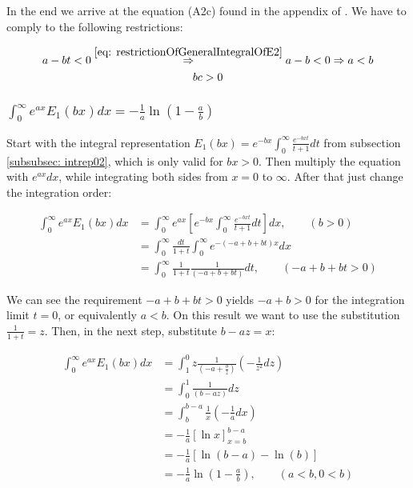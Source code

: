 \documentclass[bibliography=totocnumbered]{scrartcl}
\newcommand{\assume}[1][\text{MISSING PARAMETER}]{,\qquad\left(#1\right)}
\begin{document}
	In the end we arrive at the equation (A2c) found in the appendix of \cite{boer1990calc}. We have to comply to the following restrictions:

	\begin{subequations}
		\begin{gather}
			a-bt<0\overset{\eqref{eq: restrictionOfGeneralIntegralOfE2}}{\Rightarrow}a-b<0\Rightarrow{}a<b\\
			bc>0
		\end{gather}
	\end{subequations}

	\subsubsection[A integral of E1(x), involving the exponential function]{$\int_{0}^{\infty}e^{ax}E_1\left(bx\right)dx=-\frac{1}{a}\ln\left(1-\frac{a}{b}\right)$}
	\label{subsubsec: generalIntegralOfE3}

	Start with the integral representation $E_1\left(bx\right)=e^{-bx}\int_{0}^{\infty}\frac{e^{-bxt}}{t+1}dt$ from subsection \ref{subsubsec: intrep02}, which is only valid for $bx>0$. Then multiply the equation with $e^{ax}dx$, while integrating both sides from $x=0$ to $\infty$. After that just change the integration order:

	\begin{align}
		\int_{0}^{\infty}e^{ax}E_1\left(bx\right)dx&=\int_{0}^{\infty}e^{ax}\left[e^{-bx}\int_{0}^{\infty}\frac{e^{-bxt}}{t+1}dt\right]dx\assume[b>0]\\
		&=\int_{0}^{\infty}\frac{dt}{1+t}\int_{0}^{\infty}e^{-\left(-a+b+bt\right)x}dx\\
		&=\int_{0}^{\infty}\frac{1}{1+t}\frac{1}{\left(-a+b+bt\right)}dt\assume[-a+b+bt>0]
	\end{align}

	We can see the requirement $-a+b+bt>0$ yields $-a+b>0$ for the integration limit $t=0$, or equivalently $a<b$. On this result we want to use the substitution $\frac{1}{1+t}=z$. Then, in the next step, substitute $b-az=x$:

	\begin{align}
		\int_{0}^{\infty}e^{ax}E_1\left(bx\right)dx&=\int_{1}^{0}z\frac{1}{\left(-a+\frac{b}{z}\right)}\left(-\frac{1}{z^2}dz\right)\\
		&=\int_{0}^{1}\frac{1}{\left(b-az\right)}dz\\
		&=\int_{b}^{b-a}\frac{1}{x}\left(-\frac{1}{a}dx\right)\\
		&=-\frac{1}{a}\left[\ln{x}\right]^{b-a}_{x=b}\\
		&=-\frac{1}{a}\left[\ln{\left(b-a\right)}-\ln{\left(b\right)}\right]\\
		&=-\frac{1}{a}\ln{\left(1-\frac{a}{b}\right)}\assume[a<b, 0<b]\label{eq: generalIntegralOfE3}
	\end{align}
\end{document}
